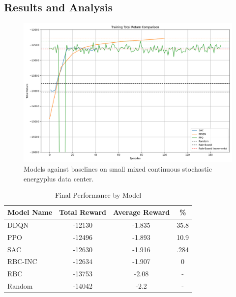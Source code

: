 \documentclass[12pt]{article}
\begin{document}
\subsection{Results and Analysis}

\begin{figure}[h!]
    \centering
    \includegraphics[height=0.5\textheight, width=1\textwidth, keepaspectratio]{images/graph__.png} %
    \caption{Models against baselines on small mixed continuous stochastic energyplus data center. }
    \label{fig:maincomparison}
\end{figure}

\begin{table}[ht]
\centering
\caption{Final Performance by Model}
\label{tab:datatable}
\begin{tabular}{|l|c|c|c|}
\hline
\textbf{Model Name} & \textbf{Total Reward} & \textbf{Average Reward} & \textbf{\%} \\ \hline
DDQN                & -12130                     & -1.835                       & 35.8           \\ \hline
PPO               & -12496                     & -1.893                       & 10.9           \\ \hline
SAC                & -12630                     & -1.916                       & .284           \\ \hline
RBC-INC                & -12634                     & -1.907                       & 0           \\ \hline
RBC            & -13753                     & -2.08                       & -           \\ \hline
Random             & -14042                     & -2.2                       & -           \\ \hline
\end{tabular}
\end{table}
\end{document}
